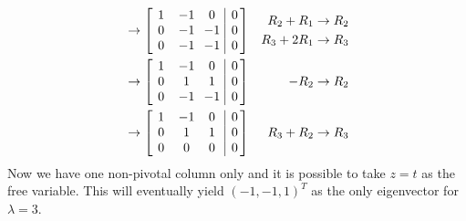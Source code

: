 \begin{solution}
\begin{align*}
&\to    
\left[\begin{array}{@{\,}wc{10pt}wc{10pt}wc{10pt}|c@{\,}}
1 & -1 & 0 & 0 \\
0 & -1 & -1 & 0 \\
0 & -1 & -1 & 0 
\end{array}\right] & \begin{aligned}
R_2 + R_1 &\to R_2 \\
R_3 + 2R_1 &\to R_3
\end{aligned} \\
&\to    
\left[\begin{array}{@{\,}wc{10pt}wc{10pt}wc{10pt}|c@{\,}}
1 & -1 & 0 & 0 \\
0 & 1 & 1 & 0 \\
0 & -1 & -1 & 0 
\end{array}\right] & -R_2 \to R_2 \\
&\to    
\left[\begin{array}{@{\,}wc{10pt}wc{10pt}wc{10pt}|c@{\,}}
1 & -1 & 0 & 0 \\
0 & 1 & 1 & 0 \\
0 & 0 & 0 & 0 
\end{array}\right] & R_3 + R_2 \to R_3
\end{align*}
Now we have one non-pivotal column only and it is possible to take $z=t$ as the free variable. This will eventually yield $(-1,-1,1)^T$ as the only eigenvector for $\lambda = 3$.
\end{solution}

